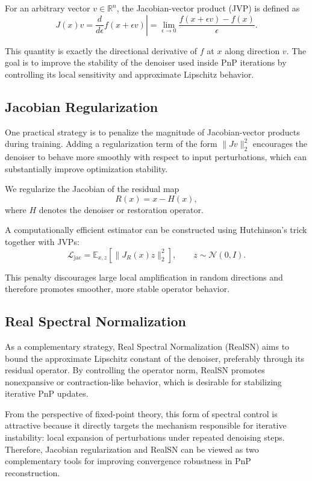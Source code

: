 \documentclass{article}
\begin{document}
For an arbitrary vector $v \in \mathbb{R}^n$, the Jacobian-vector product (JVP) is defined as
\begin{equation}
    J(x)v
    = \left.\frac{d}{d\epsilon} f(x + \epsilon v)\right|
    = \lim_{\epsilon \to 0} \frac{f(x + \epsilon v) - f(x)}{\epsilon}.
\end{equation}

This quantity is exactly the directional derivative of $f$ at $x$ along direction $v$.
The goal is to improve the stability of the denoiser used inside PnP iterations by controlling its local sensitivity and approximate Lipschitz behavior.

\subsection{Jacobian Regularization}
One practical strategy is to penalize the magnitude of Jacobian-vector products during training.
Adding a regularization term of the form $\|Jv\|_2^2$ encourages the denoiser to behave more smoothly with respect to input perturbations, which can substantially improve optimization stability.

We regularize the Jacobian of the residual map
\begin{equation}
    R(x) = x - H(x),
\end{equation}
where $H$ denotes the denoiser or restoration operator.

A computationally efficient estimator can be constructed using Hutchinson's trick together with JVPs:
\begin{equation}
    \mathcal{L}_{\mathrm{jac}}
    = \mathbb{E}_{x,z}\left[\|J_R(x) z\|_2^2\right],
    \qquad z \sim \mathcal{N}(0, I).
\end{equation}

This penalty discourages large local amplification in random directions and therefore promotes smoother, more stable operator behavior.

\subsection{Real Spectral Normalization}
As a complementary strategy, Real Spectral Normalization (RealSN) aims to bound the approximate Lipschitz constant of the denoiser, preferably through its residual operator.
By controlling the operator norm, RealSN promotes nonexpansive or contraction-like behavior, which is desirable for stabilizing iterative PnP updates.

From the perspective of fixed-point theory, this form of spectral control is attractive because it directly targets the mechanism responsible for iterative instability: local expansion of perturbations under repeated denoising steps.
Therefore, Jacobian regularization and RealSN can be viewed as two complementary tools for improving convergence robustness in PnP reconstruction.
\end{document}
